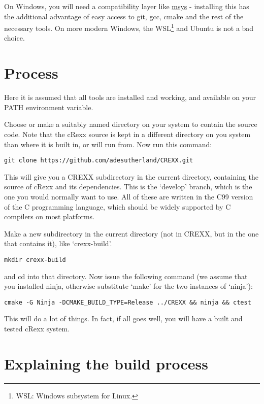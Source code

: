 On Windows, you will need a compatibility layer like
\href{https://www.msys2.org}{msys} - installing this has the additional
advantage of easy access to git, gcc, cmake and the rest of the
necessary tools. On more modern Windows, the WSL\footnote{WSL: Windows
  subsystem for Linux.} and Ubuntu is not a bad choice.

\hypertarget{process}{%
\section{Process}\label{process}}

Here it is assumed that all tools are installed and working, and
available on your PATH environment variable.

Choose or make a suitably named directory on your system to contain the
source code. Note that the cRexx source is kept in a different directory
on you system than where it is built in, or will run from. Now run this
command:

\begin{verbatim}
git clone https://github.com/adesutherland/CREXX.git
\end{verbatim}

This will give you a CREXX subdirectory in the current directory,
containing the source of cRexx and its dependencies. This is the
`develop' branch, which is the one you would normally want to use. All
of these are written in the C99 version of the C programming language,
which should be widely supported by C compilers on most platforms.

Make a new subdirectory in the current directory (not in CREXX, but in
the one that contains it), like `crexx-build'.

\begin{verbatim}
mkdir crexx-build
\end{verbatim}

and cd into that directory. Now issue the following command (we assume
that you installed ninja, otherwise substitute `make' for the two
instances of `ninja'):

\begin{verbatim}
cmake -G Ninja -DCMAKE_BUILD_TYPE=Release ../CREXX && ninja && ctest
\end{verbatim}

This will do a lot of things. In fact, if all goes well, you will have a
built and tested cRexx system.

\hypertarget{explaining-the-build-process}{%
\section{Explaining the build
process}\label{explaining-the-build-process}}

